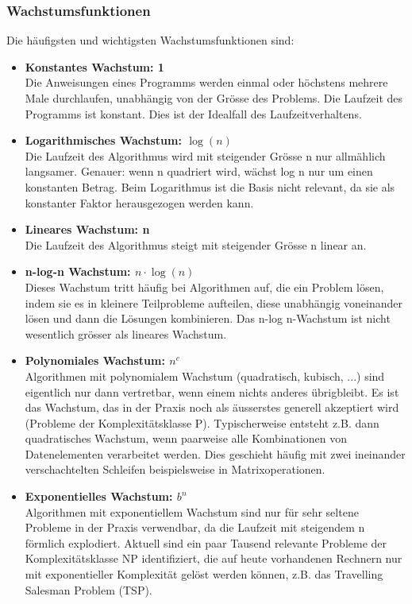\subsubsection{Wachstumsfunktionen}
Die häufigsten und wichtigsten Wachstumsfunktionen sind:
\begin{itemize}
\item \textbf{Konstantes Wachstum: 1}\\
			Die Anweisungen eines Programms werden einmal oder höchstens mehrere Male durchlaufen, unabhängig von der Grösse des Problems. Die Laufzeit des Programms ist konstant. Dies ist der Idealfall des Laufzeitverhaltens.
\item \textbf{Logarithmisches Wachstum: $\log(n)$}\\
			Die Laufzeit des Algorithmus wird mit steigender Grösse n nur allmählich langsamer. Genauer: wenn n quadriert wird, wächst log n nur um einen konstanten Betrag. Beim Logarithmus ist die Basis nicht relevant, da sie als konstanter Faktor herausgezogen werden kann.
\item \textbf{Lineares Wachstum: n}\\
			Die Laufzeit des Algorithmus steigt mit steigender Grösse n linear an.
\item \textbf{n-log-n Wachstum: $n\cdot \log(n)$}\\
			Dieses Wachstum tritt häufig bei Algorithmen auf, die ein Problem lösen, indem sie es in kleinere Teilprobleme aufteilen, diese unabhängig voneinander lösen und dann die Lösungen kombinieren. Das n-log n-Wachstum ist nicht wesentlich grösser als lineares Wachstum. 
\item \textbf{Polynomiales Wachstum: $n^c$}\\
			Algorithmen mit polynomialem Wachstum (quadratisch, kubisch, ...) sind eigentlich nur dann vertretbar, wenn einem nichts anderes übrigbleibt. Es ist das Wachstum, das in der Praxis noch als äusserstes generell akzeptiert wird (Probleme der Komplexitätsklasse P). Typischerweise entsteht z.B. dann quadratisches Wachstum, wenn paarweise alle Kombinationen von Datenelementen verarbeitet werden. Dies geschieht häufig mit zwei ineinander verschachtelten Schleifen beispielsweise in Matrixoperationen.  
\item \textbf{Exponentielles Wachstum: $b^n$}\\
			Algorithmen mit exponentiellem Wachstum sind nur für sehr seltene Probleme in der Praxis verwendbar, da die Laufzeit mit steigendem n förmlich explodiert. Aktuell sind ein paar Tausend relevante Probleme der Komplexitätsklasse NP identifiziert, die auf heute vorhandenen Rechnern nur mit exponentieller Komplexität gelöst werden können, z.B. das Travelling Salesman Problem (TSP). 
\end{itemize}

